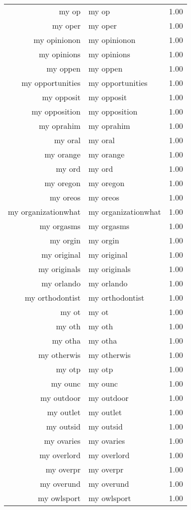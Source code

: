 \begin{table}[ht]
\begin{tabular}{rlr}
  my op & my op & 1.00 \\ 
  my oper & my oper & 1.00 \\ 
  my opinionon & my opinionon & 1.00 \\ 
  my opinions & my opinions & 1.00 \\ 
  my oppen & my oppen & 1.00 \\ 
  my opportunities & my opportunities & 1.00 \\ 
  my opposit & my opposit & 1.00 \\ 
  my opposition & my opposition & 1.00 \\ 
  my oprahim & my oprahim & 1.00 \\ 
  my oral & my oral & 1.00 \\ 
  my orange & my orange & 1.00 \\ 
  my ord & my ord & 1.00 \\ 
  my oregon & my oregon & 1.00 \\ 
  my oreos & my oreos & 1.00 \\ 
  my organizationwhat & my organizationwhat & 1.00 \\ 
  my orgasms & my orgasms & 1.00 \\ 
  my orgin & my orgin & 1.00 \\ 
  my original & my original & 1.00 \\ 
  my originals & my originals & 1.00 \\ 
  my orlando & my orlando & 1.00 \\ 
  my orthodontist & my orthodontist & 1.00 \\ 
  my ot & my ot & 1.00 \\ 
  my oth & my oth & 1.00 \\ 
  my otha & my otha & 1.00 \\ 
  my otherwis & my otherwis & 1.00 \\ 
  my otp & my otp & 1.00 \\ 
  my ounc & my ounc & 1.00 \\ 
  my outdoor & my outdoor & 1.00 \\ 
  my outlet & my outlet & 1.00 \\ 
  my outsid & my outsid & 1.00 \\ 
  my ovaries & my ovaries & 1.00 \\ 
  my overlord & my overlord & 1.00 \\ 
  my overpr & my overpr & 1.00 \\ 
  my overund & my overund & 1.00 \\ 
  my owlsport & my owlsport & 1.00 \\ 

\end{tabular}
\end{table}
